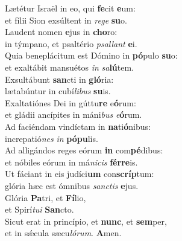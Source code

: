 \evenverse Lætétur Israël in eo, qui \textbf{fe}cit \textbf{e}um:~\*\\
\evenverse et fílii Sion exsúltent in \textit{re}\textit{ge} \textbf{su}o.\\
\oddverse Laudent nomen \textbf{e}jus in \textbf{cho}ro:~\*\\
\oddverse in týmpano, et psaltério \textit{psal}\textit{lant} \textbf{e}i.\\
\evenverse Quia beneplácitum est Dómino in \textbf{pó}pulo \textbf{su}o:~\*\\
\evenverse et exaltábit mansuétos \textit{in} \textit{sa}\textbf{lú}tem.\\
\oddverse Exsultábunt \textbf{san}cti in \textbf{gló}ria:~\*\\
\oddverse lætabúntur in cubí\textit{li}\textit{bus} \textbf{su}is.\\
\evenverse Exaltatiónes Dei in gúttu\textbf{re} e\textbf{ó}rum:~\*\\
\evenverse et gládii ancípites in máni\textit{bus} \textit{e}\textbf{ó}rum.\\
\oddverse Ad faciéndam vindíctam in \textbf{na}ti\textbf{ó}nibus:~\*\\
\oddverse increpatió\textit{nes} \textit{in} \textbf{pó}\textbf{pu}lis.\\
\evenverse Ad alligándos reges eórum \textbf{in} com\textbf{pé}dibus:~\*\\
\evenverse et nóbiles eórum in má\textit{ni}\textit{cis} \textbf{fér}\textbf{re}is.\\
\oddverse Ut fáciant in eis judíci\textbf{um} con\textbf{scríp}tum:~\*\\
\oddverse glória hæc est ómnibus \textit{san}\textit{ctis} \textbf{e}jus.\\
\evenverse Glória \textbf{Pa}tri, et \textbf{Fí}lio,~\*\\
\evenverse et Spirí\textit{tu}\textit{i} \textbf{San}cto.\\
\oddverse Sicut erat in princípio, et \textbf{nunc}, et \textbf{sem}per,~\*\\
\oddverse et in sǽcula sæcu\textit{ló}\textit{rum}. \textbf{A}men.\\
